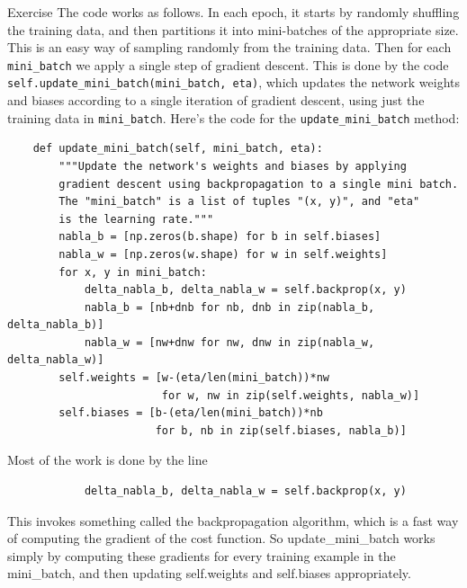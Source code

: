 \begin{exerciseBox}{Exercise}
The code works as follows. In each epoch, it starts by randomly shuffling the training data, and then partitions it into mini-batches of the appropriate size. This is an easy way of sampling randomly from the training data. Then for each \texttt{mini\_\allowbreak{}batch} we apply a single step of gradient descent. This is done by the code \texttt{self.update\_\allowbreak{}mini\_\allowbreak{}batch(mini\_\allowbreak{}batch, eta)}, which updates the network weights and biases according to a single iteration of gradient descent, using just the training data in \texttt{mini\_\allowbreak{}batch}. Here's the code for the \texttt{update\_\allowbreak{}mini\_\allowbreak{}batch} method:



\begin{lstlisting}
    def update_mini_batch(self, mini_batch, eta):
        """Update the network's weights and biases by applying
        gradient descent using backpropagation to a single mini batch.
        The "mini_batch" is a list of tuples "(x, y)", and "eta"
        is the learning rate."""
        nabla_b = [np.zeros(b.shape) for b in self.biases]
        nabla_w = [np.zeros(w.shape) for w in self.weights]
        for x, y in mini_batch:
            delta_nabla_b, delta_nabla_w = self.backprop(x, y)
            nabla_b = [nb+dnb for nb, dnb in zip(nabla_b, delta_nabla_b)]
            nabla_w = [nw+dnw for nw, dnw in zip(nabla_w, delta_nabla_w)]
        self.weights = [w-(eta/len(mini_batch))*nw 
                        for w, nw in zip(self.weights, nabla_w)]
        self.biases = [b-(eta/len(mini_batch))*nb 
                       for b, nb in zip(self.biases, nabla_b)]

\end{lstlisting}


Most of the work is done by the line



\begin{lstlisting}
            delta_nabla_b, delta_nabla_w = self.backprop(x, y)

\end{lstlisting}


This invokes something called the backpropagation algorithm, which is a fast way of computing the gradient of the cost function. So update\_\allowbreak{}mini\_\allowbreak{}batch works simply by computing these gradients for every training example in the mini\_\allowbreak{}batch, and then updating self.weights and self.biases appropriately.



\end{exerciseBox}
